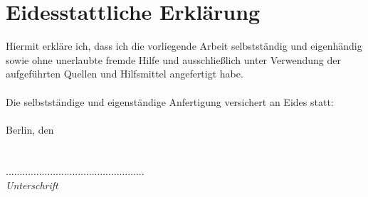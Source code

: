 \section*{Eidesstattliche Erkl\"arung}
Hiermit erkl\"are ich, dass ich die vorliegende Arbeit selbstst\"andig und eigenh\"andig sowie ohne unerlaubte fremde
Hilfe und ausschlie{\ss}lich unter Verwendung der aufgef\"uhrten Quellen und Hilfsmittel angefertigt habe.\\\\
Die selbstst\"andige und eigenst\"andige Anfertigung versichert an Eides statt:\\\\
Berlin, den\\\\\\
..................................................\\
\textit{Unterschrift}
